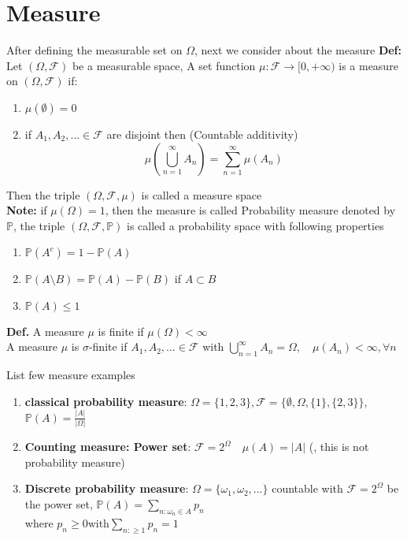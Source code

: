 \newpage
\section{Measure}
After defining the measurable set on $\Omega$, next we consider about the measure
\textbf{Def:} Let $(\Omega, \mathcal{F})$ be a measurable space, A set function $\mu: \mathcal{F} \rightarrow [0, +\infty)$ is a measure on $(\Omega, \mathcal{F})$ if:
\begin{enumerate}
    \item $\mu(\emptyset) = 0$
    \item if $A_1, A_2, ... \in \mathcal{F}$ are disjoint then \quad (Countable additivity)
    \begin{equation*}
        \mu(\bigcup\limits_{n=1}^{\infty}A_n) = \sum\limits_{n=1}^{\infty}\mu(A_n)
    \end{equation*}
\end{enumerate}
Then the triple $(\Omega, \mathcal{F}, \mu)$ is called a measure space \\[1cm]
\textbf{Note:} if $\mu(\Omega) = 1$, then the measure is called Probability measure denoted by $\mathbb{P}$, the triple $(\Omega, \mathcal{F}, \mathbb{P})$ is called a probability space with following properties 
\begin{enumerate}
    \item $\mathbb{P}(A^c) = 1-\mathbb{P}(A)$
    \item $\mathbb{P}(A \setminus B) = \mathbb{P}(A) - \mathbb{P}(B)$ if $A\subset B$
    \item $\mathbb{P}(A) \leq 1$
\end{enumerate}
\textbf{Def.} A measure $\mu$ is finite if $\mu(\Omega) < \infty$ \\
A measure $\mu$ is $\sigma$-finite if $A_1, A_2, ...\in \mathcal{F}$ with $\bigcup\limits_{n=1}^{\infty}A_n = \Omega, \quad \mu(A_n)< \infty,\forall n$ \\[2cm]
\begin{ex} List few measure examples
\begin{enumerate}
    \item \textbf{classical probability measure}: $\Omega = \{1,2,3\}, \mathcal{F} = \{\emptyset, \Omega, \{1\}, \{2,3\}\}$, $\mathbb{P}(A) = \frac{|A|}{|\Omega|}$
    \item \textbf{Counting measure: Power set}: $\mathcal{F} = 2^\Omega \quad \mu(A) = |A|$    (, this is not probability measure)
    \item \textbf{Discrete probability measure}: $\Omega = \{\omega_1, \omega_2, ...\}$ countable with $\mathcal{F} = 2^\Omega$ be the power set, $\mathbb{P}(A) = \sum\limits_{n: \omega_n \in A} p_n$ \\ where $p_n \geq 0 \text{with} \sum\limits_{n:\geq 1} p_n = 1$
\end{enumerate}
\end{ex}
\newpage
